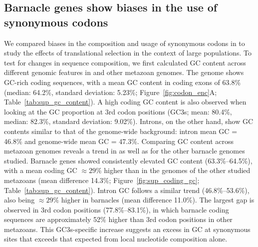 \subsection*{Barnacle genes show biases in the use of synonymous codons}

We compared biases in the composition and usage of synonymous codons in \bgla{} to study
the effects of translational selection in the context of large populations.
To test for changes in sequence composition, we first calculated GC content across
different genomic features in \bgla{} and other metazoan genomes.
The \bgla{} genome shows GC-rich coding sequences, with a mean GC content in coding exons
of 63.8\% (median: 64.2\%, standard deviation: 5.23\%; Figure~\ref{fig:codon_enc}A;
Table~\ref{tab:sup_gc_content}).
A high coding GC content is also observed when looking at the GC proportion at 3rd codon
positions (GC3s; mean: 80.4\%, median: 82.3\%, standard deviation: 9.02\%).
Introns, on the other hand, show GC contents similar to that of the genome-wide background:
intron mean GC = 46.8\% and genome-wide mean GC = 47.3\%.
Comparing GC content across metazoan genomes reveals a trend in \bgla{} as well as for the
other barnacle genomes studied.
Barnacle genes showed consistently elevated GC content (63.3\%--64.5\%), with a mean
coding GC $\approx29\%$ higher than in the genomes of the other studied metazoans
(mean difference 14.3\%; Figure~\ref{fig:sup_coding_gc}; Table~\ref{tab:sup_gc_content}).
Intron GC follows a similar trend (46.8\%--53.6\%), also being $\approx29\%$ higher in
barnacles (mean difference 11.0\%).
The largest gap is observed in 3rd codon positions (77.8\%--83.1\%), in which barnacle
coding sequences are approximately 52\% higher than 3rd codon positions in other metazoans.
This GC3s-specific increase suggests an excess in GC at synonymous sites that exceeds
that expected from local nucleotide composition alone.
\vspace{0.1cm}

